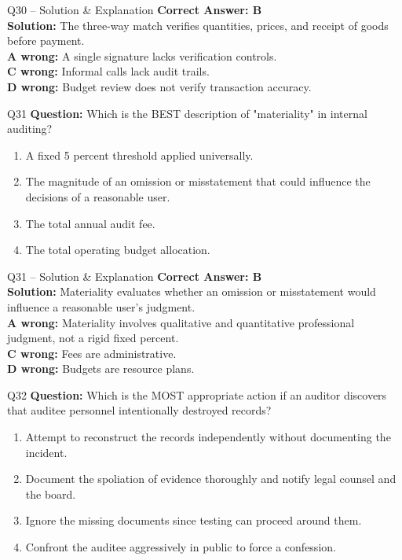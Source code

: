 \documentclass[aspectratio=169,10pt]{beamer}
\begin{document}
	\begin{frame}[t]{Q30 -- Solution \& Explanation}
		\small
		\textbf{Correct Answer: B} \\[4pt]
		\textbf{Solution:} The three-way match verifies quantities, prices, and receipt of goods before payment. \\[4pt]
		\textbf{A wrong:} A single signature lacks verification controls. \\[2pt]
		\textbf{C wrong:} Informal calls lack audit trails. \\[2pt]
		\textbf{D wrong:} Budget review does not verify transaction accuracy.
	\end{frame}
	
	\begin{frame}[t]{Q31}
		\small
		\textbf{Question:} Which is the BEST description of "materiality" in internal auditing?
		\begin{enumerate}[label=\Alph*.,itemsep=1pt,topsep=2pt]
			\item A fixed 5 percent threshold applied universally.
			\item The magnitude of an omission or misstatement that could influence the decisions of a reasonable user.
			\item The total annual audit fee.
			\item The total operating budget allocation.
		\end{enumerate}
	\end{frame}
	
	\begin{frame}[t]{Q31 -- Solution \& Explanation}
		\small
		\textbf{Correct Answer: B} \\[4pt]
		\textbf{Solution:} Materiality evaluates whether an omission or misstatement would influence a reasonable user's judgment. \\[4pt]
		\textbf{A wrong:} Materiality involves qualitative and quantitative professional judgment, not a rigid fixed percent. \\[2pt]
		\textbf{C wrong:} Fees are administrative. \\[2pt]
		\textbf{D wrong:} Budgets are resource plans.
	\end{frame}
	
	\begin{frame}[t]{Q32}
		\small
		\textbf{Question:} Which is the MOST appropriate action if an auditor discovers that auditee personnel intentionally destroyed records?
		\begin{enumerate}[label=\Alph*.,itemsep=1pt,topsep=2pt]
			\item Attempt to reconstruct the records independently without documenting the incident.
			\item Document the spoliation of evidence thoroughly and notify legal counsel and the board.
			\item Ignore the missing documents since testing can proceed around them.
			\item Confront the auditee aggressively in public to force a confession.
		\end{enumerate}
	\end{frame}
	
\end{document}
